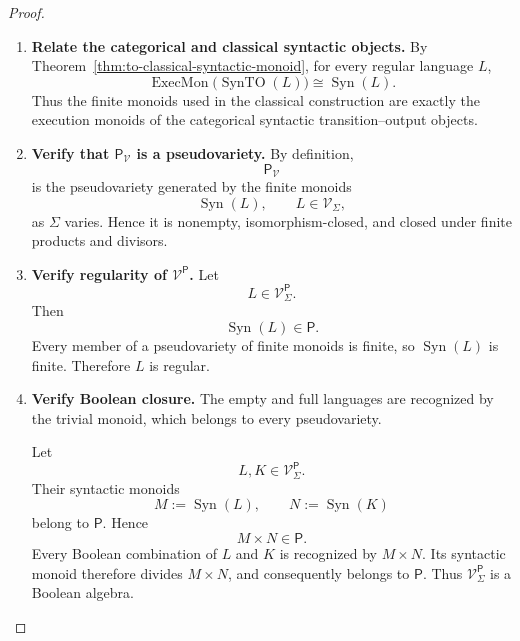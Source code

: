 \begin{proof}
    \leavevmode
    \begin{enumerate}
        \item \textbf{Relate the categorical and classical syntactic objects.}
        By Theorem~\ref{thm:to-classical-syntactic-monoid}, for every regular
        language \(L\),
        \[
            \operatorname{ExecMon}
            \bigl(
                \operatorname{SynTO}(L)
            \bigr)
            \cong
            \operatorname{Syn}(L).
        \]
        Thus the finite monoids used in the classical construction are
        exactly the execution monoids of the categorical syntactic
        transition--output objects.

        \item \textbf{Verify that \(\mathsf P_{\mathcal V}\) is a
        pseudovariety.}
        By definition,
        \[
            \mathsf P_{\mathcal V}
        \]
        is the pseudovariety generated by the finite monoids
        \[
            \operatorname{Syn}(L),
            \qquad
            L\in\mathcal V_\Sigma,
        \]
        as \(\Sigma\) varies. Hence it is nonempty, isomorphism-closed, and
        closed under finite products and divisors.

        \item \textbf{Verify regularity of
        \(\mathcal V^{\mathsf P}\).}
        Let
        \[
            L\in\mathcal V^{\mathsf P}_\Sigma.
        \]
        Then
        \[
            \operatorname{Syn}(L)\in\mathsf P.
        \]
        Every member of a pseudovariety of finite monoids is finite, so
        \(\operatorname{Syn}(L)\) is finite. Therefore \(L\) is regular.

        \item \textbf{Verify Boolean closure.}
        The empty and full languages are recognized by the trivial monoid,
        which belongs to every pseudovariety.

        Let
        \[
            L,K\in\mathcal V^{\mathsf P}_\Sigma.
        \]
        Their syntactic monoids
        \[
            M:=\operatorname{Syn}(L),
            \qquad
            N:=\operatorname{Syn}(K)
        \]
        belong to \(\mathsf P\). Hence
        \[
            M\times N\in\mathsf P.
        \]
        Every Boolean combination of \(L\) and \(K\) is recognized by
        \(M\times N\). Its syntactic monoid therefore divides
        \(M\times N\), and consequently belongs to \(\mathsf P\). Thus
        \(\mathcal V^{\mathsf P}_\Sigma\) is a Boolean algebra.


\end{enumerate}
\end{proof}
